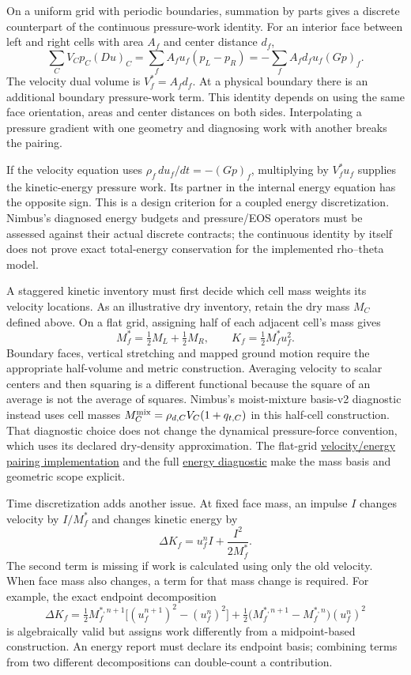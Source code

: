 On a uniform grid with periodic boundaries, summation by parts gives a discrete
counterpart of the continuous pressure-work identity. For an interior face
between left and right cells with area $A_f$ and center distance $d_f$,
\[
 \sum_C V_C p_C(Du)_C
 =\sum_f A_f u_f(p_L-p_R)
 =-\sum_f A_f d_f u_f(Gp)_f.
\]
The velocity dual volume is $V_f^*=A_fd_f$. At a physical boundary there is an
additional boundary pressure-work term. This identity depends on using the same
face orientation, areas and center distances on both sides. Interpolating a
pressure gradient with one geometry and diagnosing work with another breaks
the pairing.

If the velocity equation uses $\rho_f\,du_f/dt=-(Gp)_f$, multiplying by
$V_f^*u_f$ supplies the kinetic-energy pressure work. Its partner in the internal
energy equation has the opposite sign. This is a design criterion for a coupled
energy discretization. Nimbus's diagnosed energy budgets and pressure/EOS
operators must be assessed against their actual discrete contracts; the
continuous identity by itself does not prove exact total-energy conservation
for the implemented rho--theta model.

A staggered kinetic inventory must first decide which cell mass weights its
velocity locations. As an illustrative dry inventory, retain the dry mass $M_C$
defined above. On a flat grid, assigning half of each adjacent cell's mass gives
\[
 M_f^*=\tfrac12M_L+\tfrac12M_R,
 \qquad K_f=\tfrac12M_f^*u_f^2.
\]
Boundary faces, vertical stretching and mapped ground motion require the
appropriate half-volume and metric construction. Averaging velocity to scalar
centers and then squaring is a different functional because the square of an
average is not the average of squares. Nimbus's moist-mixture basis-v2 diagnostic
instead uses cell masses $M_C^{\rm mix}=\rho_{d,C}V_C(1+q_{t,C})$ in this
half-cell construction. That diagnostic choice does not change the dynamical
pressure-force convention, which uses its declared dry-density approximation.
The flat-grid
\href{../src/diagnostics/budgets/velocity_energy_pair.cpp}{velocity/energy
pairing implementation} and the full
\href{../src/diagnostics/budgets/energy_budget.cpp}{energy diagnostic} make the
mass basis and geometric scope explicit.

Time discretization adds another issue. At fixed face mass, an impulse $I$
changes velocity by $I/M_f^*$ and changes kinetic energy by
\[
 \Delta K_f=u_f^n I+\frac{I^2}{2M_f^*}.
\]
The second term is missing if work is calculated using only the old velocity.
When face mass also changes, a term for that mass change is required. For
example, the exact endpoint decomposition
\[
 \Delta K_f=\tfrac12 M_f^{*,n+1}
  \big[(u_f^{n+1})^2-(u_f^n)^2\big]
 +\tfrac12\big(M_f^{*,n+1}-M_f^{*,n}\big)(u_f^n)^2
\]
is algebraically valid but assigns work differently from a midpoint-based
construction. An energy report must declare its endpoint basis; combining
terms from two different decompositions can double-count a contribution.

